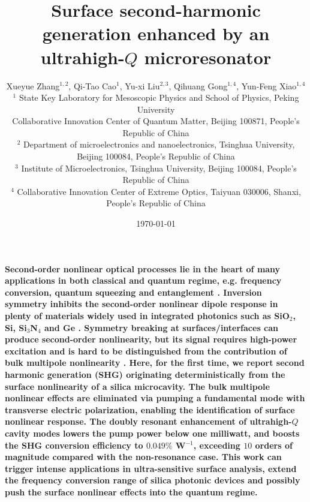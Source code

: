 \documentclass[a4paper,8pt,hyperref, twocolumn]{article}
\title{\bfseries \Large 
Surface second-harmonic generation enhanced by an ultrahigh-$Q$ microresonator
}
\author{\normalsize  Xueyue Zhang$^{1,2}$, Qi-Tao Cao$^{1}$, Yu-xi Liu$^{2,3}$, Qihuang Gong$^{1,4}$, Yun-Feng Xiao$^{1,4}$ \\
\normalsize $^1$ State Key Laboratory for Mesoscopic Physics and School of Physics, Peking University \\
\normalsize Collaborative Innovation Center of Quantum Matter, Beijing 100871, People's Republic of China \\
\normalsize $^2$ Department of microelectronics and nanoelectronics, Tsinghua University, Beijing 100084, People’s Republic of China \\
\normalsize $^3$ Institute of Microelectronics, Tsinghua University, Beijing 100084, People’s Republic of China \\
\normalsize $^4$ Collaborative Innovation Center of Extreme Optics, Taiyuan 030006, Shanxi, People’s Republic of China
}
\date{\normalsize \today}
\begin{document}
\maketitle


\textbf{
Second-order nonlinear optical processes lie in the heart of many applications in both classical and quantum regime, e.g. frequency conversion,  quantum squeezing \cite{lugiato1983squeezed} and entanglement \cite{kwiat1995new}. 
Inversion symmetry inhibits the second-order nonlinear dipole response in plenty of materials widely used in integrated photonics such as SiO$_2$, Si, Si$_3$N$_4$ and Ge \cite{boyd2003nonlinear, leuthold2010nonlinear, moss2013new}.
Symmetry breaking %
at surfaces/interfaces can produce second-order nonlinearity, but its signal requires high-power excitation and is hard to be distinguished from the contribution of bulk multipole nonlinearity \cite{shen1989surface, heinz1991second}.  %
Here, for the first time, we report second harmonic generation (SHG) originating deterministically from the surface nonlinearity of a silica microcavity.
The bulk multipole nonlinear effects are eliminated via pumping a fundamental mode with transverse electric polarization, enabling the identification of surface nonlinear response.
The doubly resonant enhancement of ultrahigh-$Q$ cavity modes lowers the pump power below one milliwatt, and boosts the SHG conversion efficiency to $0.049\%$ W$^{-1}$, exceeding $10$ orders of magnitude compared with the non-resonance case. 
This work can trigger intense applications in ultra-sensitive surface analysis, extend the frequency conversion range of silica photonic devices and possibly push the surface nonlinear effects into the quantum regime.
}
\end{document}
